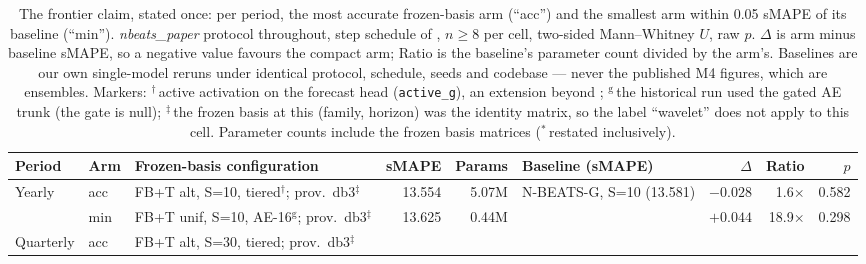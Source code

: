 
\begin{table}[t]
\caption{The frontier claim, stated once: per period, the most accurate
frozen-basis arm (``acc'') and the smallest arm within 0.05 sMAPE of its
baseline (``min''). \emph{nbeats\_paper} protocol throughout, step schedule
of \citet{oreshkin2020nbeats}, $n \geq 8$ per cell, two-sided Mann--Whitney
$U$, raw $p$. $\Delta$ is arm minus baseline sMAPE, so a negative value
favours the compact arm; Ratio is the baseline's parameter count divided by
the arm's. Baselines are our own single-model reruns under identical
protocol, schedule, seeds and codebase --- never the published M4 figures,
which are ensembles. Markers: $^{\dag}$\,active activation on the forecast
head (\texttt{active\_g}), an extension beyond
\citet{oreshkin2020nbeats}; $^{\mathrm{g}}$\,the historical run used the
gated AE trunk (the gate is null); $^{\ddag}$\,the frozen basis at this
(family, horizon) was the identity matrix, so the label ``wavelet'' does
not apply to this cell. Parameter counts include the frozen basis matrices
($^{\ast}$\,restated inclusively).}
\label{tab:sub1m_frontier}
\centering
\scriptsize
\setlength{\tabcolsep}{2.5pt}
\begin{tabular}{llp{4.35cm}rrlrrr}
  \toprule
  Period & Arm & Frozen-basis configuration & sMAPE & Params &
  Baseline (sMAPE) & $\Delta$ & Ratio & $p$ \\
  \midrule
  Yearly & acc & FB+T alt, S=10, tiered$^{\dag}$; prov.\ db3$^{\ddag}$ &
    13.554 & 5.07M & N-BEATS-G, S=10 (13.581) &
    $\mathbf{-0.028}$ & 1.6$\times$ & 0.582 \\
         & min & FB+T unif, S=10, AE-16$^{\mathrm{g}}$;
    prov.\ db3$^{\ddag}$ &
    13.625 & 0.44M & & $+0.044$ & 18.9$\times$ & 0.298 \\
  \addlinespace[2pt]
  Quarterly & acc & FB+T alt, S=30, tiered; prov.\ db3$^{\ddag}$ &

\end{tabular}
\end{table}
